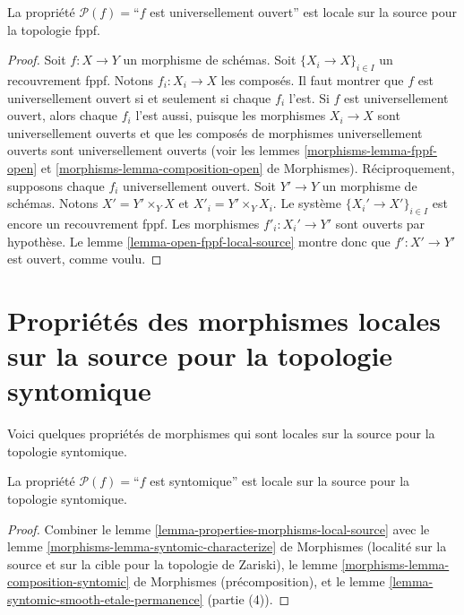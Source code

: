 \begin{lemma}
\label{lemma-universally-open-fppf-local-source}
La propriété $\mathcal{P}(f)=$``$f$ est universellement ouvert''
est locale sur la source pour la topologie fppf.
\end{lemma}

\begin{proof}
Soit $f : X \to Y$ un morphisme de schémas.
Soit $\{X_i \to X\}_{i \in I}$ un recouvrement fppf.
Notons $f_i : X_i \to X$ les composés. Il faut montrer que $f$ est
universellement ouvert si et seulement si chaque $f_i$ l'est.
Si $f$ est universellement ouvert, alors chaque $f_i$ l'est aussi, puisque les
morphismes $X_i \to X$ sont universellement ouverts et que les composés de
morphismes universellement ouverts sont universellement ouverts
(voir les lemmes \ref{morphisms-lemma-fppf-open}
et \ref{morphisms-lemma-composition-open} de Morphismes).
Réciproquement, supposons chaque $f_i$ universellement ouvert.
Soit $Y' \to Y$ un morphisme de schémas.
Notons $X' = Y' \times_Y X$ et $X'_i = Y' \times_Y X_i$.
Le système $\{X_i' \to X'\}_{i \in I}$ est encore un recouvrement fppf.
Les morphismes $f'_i : X_i' \to Y'$ sont ouverts par hypothèse.
Le lemme \ref{lemma-open-fppf-local-source} montre donc que
$f' : X' \to Y'$ est ouvert, comme voulu.
\end{proof}



\section{Propriétés des morphismes locales sur la source pour la topologie syntomique}
\label{section-syntomic-local-source}

\noindent
Voici quelques propriétés de morphismes qui sont locales sur la source pour la
topologie syntomique.

\begin{lemma}
\label{lemma-syntomic-syntomic-local-source}
La propriété $\mathcal{P}(f)=$``$f$ est syntomique''
est locale sur la source pour la topologie syntomique.
\end{lemma}

\begin{proof}
Combiner le lemme \ref{lemma-properties-morphisms-local-source} avec le
lemme \ref{morphisms-lemma-syntomic-characterize} de Morphismes
(localité sur la source et sur la cible pour la topologie de Zariski), le
lemme \ref{morphisms-lemma-composition-syntomic} de Morphismes
(précomposition), et le
lemme \ref{lemma-syntomic-smooth-etale-permanence} (partie (4)).
\end{proof}




